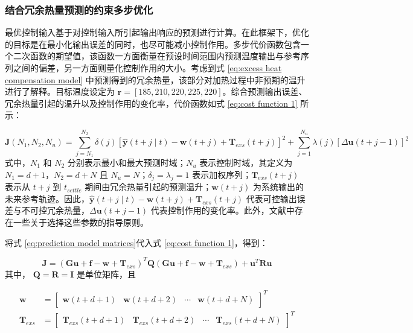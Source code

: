 \subsubsection{结合冗余热量预测的约束多步优化}
最优控制输入基于对控制输入所引起输出响应的预测进行计算。在此框架下，优化的目标是在最小化输出误差的同时，也尽可能减小控制作用。多步代价函数包含一个二次函数的期望值，该函数一方面衡量在预设时间范围内预测温度输出与参考序列之间的偏差，另一方面则量化控制作用的大小。考虑到式 \ref{eq:excess heat compensation model} 中预测得到的冗余热量，该部分对加热过程中非预期的温升进行了解释。目标温度设定为 $\boldsymbol{r} = [185, 210, 220, 225, 220]$。综合预测输出误差、冗余热量引起的温升以及控制作用的变化率，代价函数如式 \ref{eq:cost function 1} 所示：\par
\begin{equation}
    \boldsymbol{J}\left(N_{1}, N_{2}, N_{u}\right)
    = \sum_{j=N_{1}}^{N_{2}} \delta(j)[\hat{\boldsymbol{y}}(t+j \mid t)-\boldsymbol{w}(t+j)+\boldsymbol{T}_{exs}(t+j)]^{2}+\sum_{j=1}^{N_{u}} \lambda(j)[\Delta \boldsymbol{u}(t+j-1)]^{2}
    \label{eq:cost function 1}
\end{equation}
式中，$N_1$ 和 $N_2$ 分别表示最小和最大预测时域；$N_u$ 表示控制时域，其定义为 $N_1=d+1$，$N_2=d+N$ 且 $N_u=N$；$\delta_j=\lambda_j=1$ 表示加权序列；$\boldsymbol{T}_{exs}(t+j)$ 表示从 $t+j$ 到 $t_{settle}$ 期间由冗余热量引起的预测温升；$\boldsymbol{w}(t+j)$ 为系统输出的未来参考轨迹。因此，$\hat{\boldsymbol{y}}(t+j \mid t)-\boldsymbol{w}(t+j)+\boldsymbol{T}_{exs}(t+j)$ 代表可控输出误差与不可控冗余热量，$\Delta \boldsymbol{u}(t+j-1)$ 代表控制作用的变化率。此外，文献\cite{Jeon_2022_melt}中存在一些关于选择这些参数的指导原则。\par
将式 \ref{eq:prediction model matrices}代入式 \ref{eq:cost function 1}，得到：\par
\begin{equation}
    \boldsymbol{J}=(\mathbf{G} \mathbf{u}+\mathbf{f}-\mathbf{w}+\mathbf{T}_{exs})^{T}\mathbf{Q}(\mathbf{G} \mathbf{u}+\mathbf{f}-\mathbf{w}+\mathbf{T}_{exs}) + \mathbf{u}^{T}\mathbf{R}\mathbf{u}
    \label{eq:cost function 2}
\end{equation}
其中， $\mathbf{Q} = \mathbf{R} = \mathbf{I}$ 是单位矩阵，且\par
\begin{equation}
    \begin{array}{cl}
        \mathbf{w} &= \left[\begin{array}{cccc} \boldsymbol{w}(t+d+1) &\boldsymbol{w}(t+d+2) &\cdots &\boldsymbol{w}(t+d+N) \end{array}\right]^{T}\\
        \mathbf{T}_{exs} &= \left[\begin{array}{cccc} \boldsymbol{T}_{exs}(t+d+1) &\boldsymbol{T}_{exs}(t+d+2) &\cdots &\boldsymbol{T}_{exs}(t+d+N) \end{array}\right]^{T}
    \end{array}
\end{equation}

